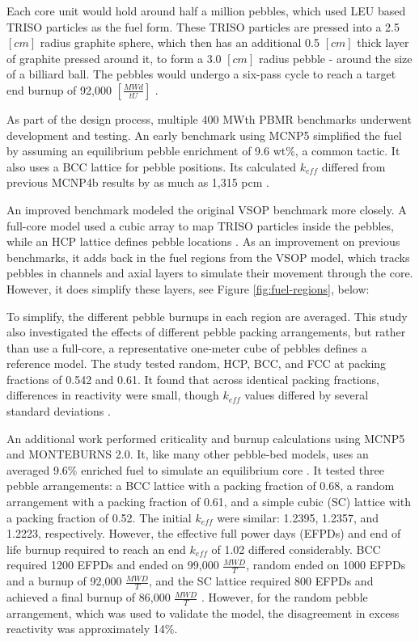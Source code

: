 

Each core unit would hold around half a million pebbles, which used LEU based TRISO particles as the fuel form.  These TRISO particles are pressed into a 2.5 $\left[cm\right]$ radius graphite sphere, which then has an additional 0.5 $\left[cm\right]$ thick layer of graphite pressed around it, to form a 3.0 $\left[cm\right]$ radius pebble - around the size of a billiard ball.  The pebbles would undergo a six-pass cycle to reach a target end burnup of 92,000 $\left[\frac{MWd}{tU}\right]$ \cite{venter_pbmr_2005}.

As part of the design process, multiple 400 MWth PBMR benchmarks underwent development and testing.  An early benchmark using MCNP5 simplified the fuel by assuming an equilibrium pebble enrichment of 9.6 wt\%, a common tactic.  It also uses a BCC lattice for pebble positions.  Its calculated $k_{eff}$ differed from previous MCNP4b results by as much as 1,315 pcm \cite{kim_monte_nodate}.

An improved benchmark modeled the original VSOP benchmark more closely.  A full-core model used a cubic array to map TRISO particles inside the pebbles, while an HCP lattice defines pebble locations \cite{albornoz_mcnp_nodate}.  As an improvement on previous benchmarks, it adds back in the fuel regions from the VSOP model, which tracks pebbles in channels and axial layers to simulate their movement through the core.  However, it does simplify these layers, see Figure \ref{fig:fuel-regions}, below:



To simplify, the different pebble burnups in each region are averaged.  This study also investigated the effects of different pebble packing arrangements, but rather than use a full-core, a representative one-meter cube of pebbles defines a reference model.  The study tested random, HCP, BCC, and FCC at packing fractions of 0.542 and 0.61.  It found that across identical packing fractions, differences in reactivity were small, though $k_{eff}$ values differed by several standard deviations \cite{albornoz_mcnp_nodate}.

An additional work performed criticality and burnup calculations using MCNP5 and MONTEBURNS 2.0.  It, like many other pebble-bed models, uses an averaged 9.6\% enriched fuel to simulate an equilibrium core \cite{noauthor_criticality_2011}.  It tested three pebble arrangements:  a BCC lattice with a packing fraction of 0.68, a random arrangement with a packing fraction of 0.61, and a simple cubic (SC) lattice with a packing fraction of 0.52.  The initial $k_{eff}$ were similar: 1.2395, 1.2357, and 1.2223, respectively.  However, the effective full power days (EFPDs) and end of life burnup required to reach an end $k_{eff}$  of 1.02 differed considerably.  BCC required 1200 EFPDs and ended on 99,000 $\frac{MWD}{T}$, random ended on 1000 EFPDs and a burnup of 92,000 $\frac{MWD}{T}$, and the SC lattice required 800 EFPDs and achieved a final burnup of 86,000 $\frac{MWD}{T}$ \cite{noauthor_criticality_2011}.  However, for the random pebble arrangement, which was used to validate the model, the disagreement in excess reactivity was approximately 14\%.

